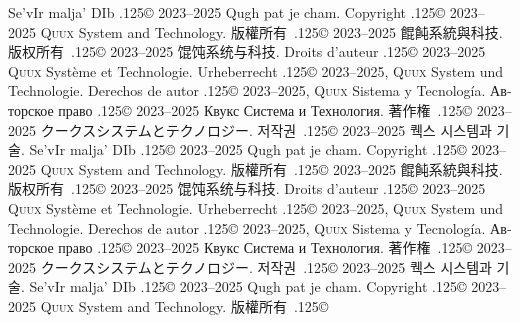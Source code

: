\documentclass{cookbook}
\begin{document}
{{{Se'vIr malja' DIb {\lower.125\baselineskip\hbox{\copyright}} %
	2023--2025 Qugh pat je cham.
Copyright {\lower.125\baselineskip\hbox{\copyright}}
	2023--2025 \textsc{Quux} System and Technology.
版權所有~{\lower.125\baselineskip\hbox{\copyright}}
	2023--2025 餛飩系統與科技.
版权所有~{\lower.125\baselineskip\hbox{\copyright}}
	2023--2025 馄饨系统与科技.
Droits d'auteur {\lower.125\baselineskip\hbox{\copyright}} %
	2023--2025 \textsc{Quux} Système et Technologie.
Urheberrecht {\lower.125\baselineskip\hbox{\copyright}} %
	2023--2025, \textsc{Quux} System und Technologie.
Derechos de autor {\lower.125\baselineskip\hbox{\copyright}} %
	2023--2025, \textsc{Quux} Sistema y Tecnología.
\foreignlanguage{russian}{Авторское право} %
	{\lower.125\baselineskip\hbox{\copyright}}
	2023–2025 \foreignlanguage{russian}{Квукс Система и Технология.}
著作権~{\lower.125\baselineskip\hbox{\copyright}}
	2023--2025 クークスシステムとテクノロジー.
저작권~{\lower.125\baselineskip\hbox{\copyright}}
	2023--2025 퀙스 시스템과 기술.
Se'vIr malja' DIb {\lower.125\baselineskip\hbox{\copyright}} %
	2023--2025 Qugh pat je cham.
Copyright {\lower.125\baselineskip\hbox{\copyright}}
	2023--2025 \textsc{Quux} System and Technology.
版權所有~{\lower.125\baselineskip\hbox{\copyright}}
	2023--2025 餛飩系統與科技.
版权所有~{\lower.125\baselineskip\hbox{\copyright}}
	2023--2025 馄饨系统与科技.
Droits d'auteur {\lower.125\baselineskip\hbox{\copyright}} %
	2023--2025 \textsc{Quux} Système et Technologie.
Urheberrecht {\lower.125\baselineskip\hbox{\copyright}} %
	2023--2025, \textsc{Quux} System und Technologie.
Derechos de autor {\lower.125\baselineskip\hbox{\copyright}} %
	2023--2025, \textsc{Quux} Sistema y Tecnología.
\foreignlanguage{russian}{Авторское право} %
	{\lower.125\baselineskip\hbox{\copyright}}
	2023–2025 \foreignlanguage{russian}{Квукс Система и Технология.}
著作権~{\lower.125\baselineskip\hbox{\copyright}}
	2023--2025 クークスシステムとテクノロジー.
저작권~{\lower.125\baselineskip\hbox{\copyright}}
	2023--2025 퀙스 시스템과 기술.
Se'vIr malja' DIb {\lower.125\baselineskip\hbox{\copyright}} %
	2023--2025 Qugh pat je cham.
Copyright {\lower.125\baselineskip\hbox{\copyright}}
	2023--2025 \textsc{Quux} System and Technology.
版權所有~{\lower.125\baselineskip\hbox{\copyright}}
}}}
\end{document}
